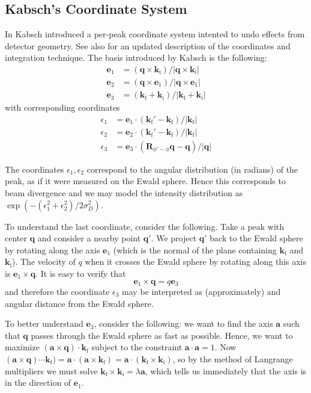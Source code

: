 \documentclass[11pt,a4paper]{article}
\def\v#1{\bm{{#1}}}
\def\si{\text{i}}
\def\sf{\text{f}}
\def\ba{\v{a}}
\def\be{{\v{e}}}
\def\k{{\v{k}}}
\def\q{{\v{q}}}
\begin{document}
\subsection{Kabsch's Coordinate System}

In \cite{Kab88b} Kabsch introduced a per-peak coordinate system intented to undo effects from detector geometry.
See also \cite{Kab10b} for an updated description of the coordinates and integration technique.
The basis introduced by Kabsch is the following:
\begin{align}
  \be_1 &= (\q \times \k_\si) / |\q \times \k_\si| \\
  \be_2 &= (\q \times \be_1) / |\q \times \be_1| \\
  \be_3 &= (\k_\sf + \k_\si) / |\k_\sf + \k_\si|
\end{align}
with corresponding coordinates
\begin{align}
  \epsilon_1 &= \be_1 \cdot (\k_\sf'-\k_\sf) / |\k_\sf| \\
  \epsilon_2 &= \be_2 \cdot (\k_\sf'-\k_\sf) / |\k_\sf| \\
  \epsilon_3 &= \be_3 \cdot (\v{R}_{\phi'-\phi}\q-\q) / |\q|
\end{align}

The coordinates $\epsilon_1, \epsilon_2$ correspond to the angular distribution (in radians) of the peak, as if it were measured on the Ewald sphere. Hence this corresponds to beam divergence and we may model the intensity distribution as $\exp(-(\epsilon_1^2 + \epsilon_2^2)/2 \sigma_D^2)$.

To understand the last coordinate, consider the following. Take a peak with center $\q$ and consider a nearby point $\q'$. We project $\q'$ back to the Ewald sphere by rotating along the axis $\be_1$ (which is the normal of the plane containing $\k_\sf$ and $\k_\si$). The velocity of $q$ when it crosses the Ewald sphere by rotating along this axis is $\be_1 \times \q$. It is easy to verify that
\begin{equation} \be_1 \times \q = q \be_3 \end{equation}
and therefore the coordinate $\epsilon_3$ may be interpreted as (approximately) and angular distance from the Ewald sphere.

To better understand $\be_3$, consider the following: we want to find the axis $\ba$ such that $\q$ passes through the Ewald sphere as fast as possible. Hence, we want to maximize $(\ba \times \q) \cdot \k_\sf$ subject to the constraint $\ba \cdot \ba = 1$.
Now $(\ba \times \q) \cdots \k_\sf) = \ba \cdot (\ba \times \k_\sf) = \ba \cdot (\k_\sf \times \k_\si)$, so by the method of Langrange multipliers we must solve $\k_\sf \times \k_\si = \lambda \ba$, which tells us immediately that the axis is in the direction of $\be_1$.
\end{document}
